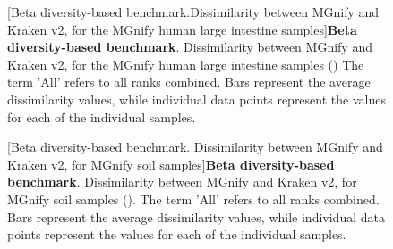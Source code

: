 \begin{figure}[H]
  \centering
  \hfill
  [Beta diversity-based benchmark.Dissimilarity between MGnify and Kraken v2, for the MGnify human large intestine samples]{\textbf{Beta diversity-based benchmark}. Dissimilarity between MGnify and Kraken v2, for the MGnify human large intestine samples () The term 'All' refers to all ranks combined. Bars represent the average dissimilarity values, while individual data points represent the values for each of the individual samples.} \label{fig:human_gut_plot_mgnifyVSkraken2.png}%
\end{figure}
\begin{figure}[H]
  \centering
  \hfill
  [Beta diversity-based benchmark. Dissimilarity between MGnify and Kraken v2, for MGnify soil samples]{\textbf{Beta diversity-based benchmark}. Dissimilarity between MGnify and Kraken v2, for MGnify soil samples (). The term 'All' refers to all ranks combined. Bars represent the average dissimilarity values, while individual data points represent the values for each of the individual samples.}
  \label{fig:soil_plot_mgnifyVSkraken2.png}%
\end{figure}